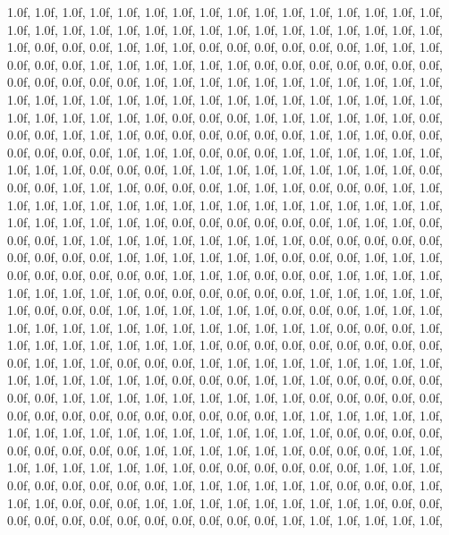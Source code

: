 {   1.0f, 1.0f, 1.0f,   1.0f, 1.0f, 1.0f,   1.0f, 1.0f, 1.0f,   1.0f, 1.0f, 1.0f,   1.0f, 1.0f, 1.0f,   1.0f, 1.0f, 1.0f,   1.0f, 1.0f, 1.0f,   1.0f, 1.0f, 1.0f,   1.0f, 1.0f, 1.0f,   1.0f, 1.0f, 1.0f,   1.0f, 1.0f, 1.0f,   0.0f, 0.0f, 0.0f,   1.0f, 1.0f, 1.0f,   0.0f, 0.0f, 0.0f,   0.0f, 0.0f, 0.0f,   1.0f, 1.0f, 1.0f,   0.0f, 0.0f, 0.0f,   1.0f, 1.0f, 1.0f,   1.0f, 1.0f, 1.0f,   0.0f, 0.0f, 0.0f,   0.0f, 0.0f, 0.0f,   0.0f, 0.0f, 0.0f,   0.0f, 0.0f, 0.0f,   1.0f, 1.0f, 1.0f,   1.0f, 1.0f, 1.0f,   1.0f, 1.0f, 1.0f,   1.0f, 1.0f, 1.0f,   1.0f, 1.0f, 1.0f,   1.0f, 1.0f, 1.0f,   1.0f, 1.0f, 1.0f,   1.0f, 1.0f, 1.0f,   1.0f, 1.0f, 1.0f,   
   1.0f, 1.0f, 1.0f,   1.0f, 1.0f, 1.0f,   0.0f, 0.0f, 0.0f,   1.0f, 1.0f, 1.0f,   1.0f, 1.0f, 1.0f,   0.0f, 0.0f, 0.0f,   1.0f, 1.0f, 1.0f,   0.0f, 0.0f, 0.0f,   0.0f, 0.0f, 0.0f,   1.0f, 1.0f, 1.0f,   0.0f, 0.0f, 0.0f,   0.0f, 0.0f, 0.0f,   1.0f, 1.0f, 1.0f,   0.0f, 0.0f, 0.0f,   1.0f, 1.0f, 1.0f,   1.0f, 1.0f, 1.0f,   1.0f, 1.0f, 1.0f,   0.0f, 0.0f, 0.0f,   1.0f, 1.0f, 1.0f,   1.0f, 1.0f, 1.0f,   1.0f, 1.0f, 1.0f,   0.0f, 0.0f, 0.0f,   1.0f, 1.0f, 1.0f,   0.0f, 0.0f, 0.0f,   1.0f, 1.0f, 1.0f,   0.0f, 0.0f, 0.0f,   1.0f, 1.0f, 1.0f,   1.0f, 1.0f, 1.0f,   1.0f, 1.0f, 1.0f,   1.0f, 1.0f, 1.0f,   1.0f, 1.0f, 1.0f,   1.0f, 1.0f, 1.0f,   
   1.0f, 1.0f, 1.0f,   1.0f, 1.0f, 1.0f,   0.0f, 0.0f, 0.0f,   0.0f, 0.0f, 0.0f,   1.0f, 1.0f, 1.0f,   0.0f, 0.0f, 0.0f,   1.0f, 1.0f, 1.0f,   1.0f, 1.0f, 1.0f,   1.0f, 1.0f, 1.0f,   0.0f, 0.0f, 0.0f,   0.0f, 0.0f, 0.0f,   0.0f, 0.0f, 0.0f,   1.0f, 1.0f, 1.0f,   1.0f, 1.0f, 1.0f,   0.0f, 0.0f, 0.0f,   1.0f, 1.0f, 1.0f,   0.0f, 0.0f, 0.0f,   0.0f, 0.0f, 0.0f,   1.0f, 1.0f, 1.0f,   0.0f, 0.0f, 0.0f,   1.0f, 1.0f, 1.0f,   1.0f, 1.0f, 1.0f,   1.0f, 1.0f, 1.0f,   0.0f, 0.0f, 0.0f,   0.0f, 0.0f, 0.0f,   1.0f, 1.0f, 1.0f,   1.0f, 1.0f, 1.0f,   0.0f, 0.0f, 0.0f,   1.0f, 1.0f, 1.0f,   1.0f, 1.0f, 1.0f,   0.0f, 0.0f, 0.0f,   1.0f, 1.0f, 1.0f,   
   1.0f, 1.0f, 1.0f,   1.0f, 1.0f, 1.0f,   1.0f, 1.0f, 1.0f,   1.0f, 1.0f, 1.0f,   0.0f, 0.0f, 0.0f,   1.0f, 1.0f, 1.0f,   1.0f, 1.0f, 1.0f,   1.0f, 1.0f, 1.0f,   0.0f, 0.0f, 0.0f,   0.0f, 0.0f, 0.0f,   0.0f, 0.0f, 0.0f,   1.0f, 1.0f, 1.0f,   0.0f, 0.0f, 0.0f,   1.0f, 1.0f, 1.0f,   1.0f, 1.0f, 1.0f,   1.0f, 1.0f, 1.0f,   1.0f, 1.0f, 1.0f,   1.0f, 1.0f, 1.0f,   0.0f, 0.0f, 0.0f,   1.0f, 1.0f, 1.0f,   0.0f, 0.0f, 0.0f,   0.0f, 0.0f, 0.0f,   1.0f, 1.0f, 1.0f,   1.0f, 1.0f, 1.0f,   1.0f, 1.0f, 1.0f,   0.0f, 0.0f, 0.0f,   0.0f, 0.0f, 0.0f,   0.0f, 0.0f, 0.0f,   0.0f, 0.0f, 0.0f,   0.0f, 0.0f, 0.0f,   1.0f, 1.0f, 1.0f,   1.0f, 1.0f, 1.0f,   
   1.0f, 1.0f, 1.0f,   1.0f, 1.0f, 1.0f,   1.0f, 1.0f, 1.0f,   1.0f, 1.0f, 1.0f,   0.0f, 0.0f, 0.0f,   0.0f, 0.0f, 0.0f,   0.0f, 0.0f, 0.0f,   1.0f, 1.0f, 1.0f,   1.0f, 1.0f, 1.0f,   0.0f, 0.0f, 0.0f,   1.0f, 1.0f, 1.0f,   1.0f, 1.0f, 1.0f,   1.0f, 1.0f, 1.0f,   0.0f, 0.0f, 0.0f,   0.0f, 0.0f, 0.0f,   1.0f, 1.0f, 1.0f,   0.0f, 0.0f, 0.0f,   0.0f, 0.0f, 0.0f,   1.0f, 1.0f, 1.0f,   1.0f, 1.0f, 1.0f,   0.0f, 0.0f, 0.0f,   1.0f, 1.0f, 1.0f,   0.0f, 0.0f, 0.0f,   1.0f, 1.0f, 1.0f,   1.0f, 1.0f, 1.0f,   1.0f, 1.0f, 1.0f,   0.0f, 0.0f, 0.0f,   0.0f, 0.0f, 0.0f,   0.0f, 0.0f, 0.0f,   0.0f, 0.0f, 0.0f,   1.0f, 1.0f, 1.0f,   1.0f, 1.0f, 1.0f,   
}
